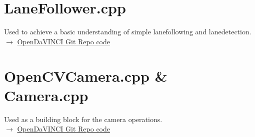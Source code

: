\section{LaneFollower.cpp}
Used to achieve a basic understanding of simple lanefollowing and
lanedetection.\\
$\rightarrow$
\href{https://github.com/se-research/OpenDaVINCI/blob/master/automotive/miniature/lanefollower/src/LaneFollower.cpp}
{OpenDaVINCI Git Repo code}

\section{OpenCVCamera.cpp \& Camera.cpp}
Used as a building block for the camera operations.\\
$\rightarrow$
\href{https://github.com/se-research/OpenDaVINCI/blob/master/automotive/miniature/proxy/src/}
{OpenDaVINCI Git Repo code}
